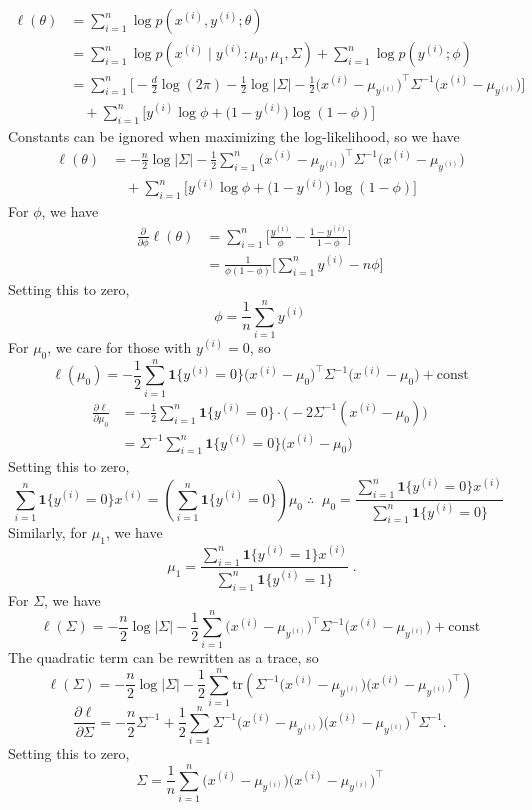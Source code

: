 \begin{answer}

$$
\begin{aligned}
\ell(\theta)
&=\sum_{i=1}^n \log p(x^{(i)},y^{(i)};\theta)\\
&=\sum_{i=1}^n \log p(x^{(i)}\mid y^{(i)};\mu_0,\mu_1,\Sigma)+\sum_{i=1}^n \log p(y^{(i)};\phi)\\
&=\sum_{i=1}^n\Bigg[-\frac{d}{2}\log(2\pi)-\frac{1}{2}\log|\Sigma|
-\frac{1}{2}\big(x^{(i)}-\mu_{y^{(i)}}\big)^\top\Sigma^{-1}\big(x^{(i)}-\mu_{y^{(i)}}\big)\Bigg]\\
&\quad +\sum_{i=1}^n\Big[y^{(i)}\log\phi+\big(1-y^{(i)}\big)\log(1-\phi)\Big]
\end{aligned}
$$
Constants can be ignored when maximizing the log-likelihood, so we have
$$
\begin{aligned}
\ell(\theta)
&=-\frac{n}{2}\log|\Sigma| - \frac{1}{2}\sum_{i=1}^n\big(x^{(i)}-\mu_{
y^{(i)}}\big)^\top\Sigma^{-1}\big(x^{(i)}-\mu_{y^{(i)}}\big)\\
&\quad +\sum_{i=1}^n\Big[y^{(i)}\log\phi+\big(1-y^{(i)}\big)\log(1-\phi)\Big]
\end{aligned}
$$
For $\phi$, we have
$$
\begin{aligned}
\frac{\partial}{\partial \phi}\ell(\theta)
&=\sum_{i=1}^n\Big[\frac{y^{(i)}}{\phi}-\frac{1-y^{(i)}}{1-\phi}\Big]\\
&=\frac{1}{\phi(1-\phi)}\Big[\sum_{i=1}^n y^{(i)} - n\phi\Big]
\end{aligned}
$$
Setting this to zero,
$$
\boxed{
\phi = \frac{1}{n}\sum_{i=1}^n y^{(i)}
}
$$
For $\mu_0$, we care for those with $y^{(i)}=0$, so
$$
\ell(\mu_0) = -\frac{1}{2}\sum_{i=1}^n \mathbf{1}\{y^{(i)}=0\}
\big(x^{(i)}-\mu_0\big)^\top\Sigma^{-1}\big(x^{(i)}-\mu_0\big) + \text{const}
$$
$$
\begin{aligned}
\frac{\partial \ell}{\partial \mu_0}
&= -\frac{1}{2}\sum_{i=1}^n \mathbf{1}\{y^{(i)}=0\}\cdot 
\big(-2\Sigma^{-1}(x^{(i)}-\mu_0)\big)\\
&=\Sigma^{-1}\sum_{i=1}^n \mathbf{1}\{y^{(i)}=0\}\big(x^{(i)}-\mu_0\big)
\end{aligned}
$$
Setting this to zero,
$$
\sum_{i=1}^n \mathbf{1}\{y^{(i)}=0\}x^{(i)}=
\left(\sum_{i=1}^n \mathbf{1}\{y^{(i)}=0\}\right)\mu_0
\;\therefore\;
\boxed{\;\displaystyle \mu_0=\frac{\sum_{i=1}^n \mathbf{1}\{y^{(i)}=0\}x^{(i)}}{\sum_{i=1}^n \mathbf{1}\{y^{(i)}=0\}}\; }
$$
Similarly, for $\mu_1$, we have
$$
\boxed{\;\displaystyle \mu_1=\frac{\sum_{i=1}^n \mathbf{1}\{y^{(i)}=1\}x^{(i)}}{\sum_{i=1}^n \mathbf{1}\{y^{(i)}=1\}}\; }.
$$
For $\Sigma$, we have
$$
\ell(\Sigma)=-\frac{n}{2}\log|\Sigma|-\frac{1}{2}\sum_{i=1}^n
\big(x^{(i)}-\mu_{y^{(i)}}\big)^\top\Sigma^{-1}\big(x^{(i)}-\mu_{y^{(i)}}\big)+\text{const}
$$
The quadratic term can be rewritten as a trace, so
$$
\ell(\Sigma)=-\frac{n}{2}\log|\Sigma|-\frac{1}{2}\sum_{i=1}^n
\text{tr}(\Sigma^{-1}\big(x^{(i)}-\mu_{y^{(i)}}\big)\big(x^{(i)}-\mu_{y^{(i)}}\big)^\top)
$$
$$
\frac{\partial \ell}{\partial \Sigma}
=-\frac{n}{2}\Sigma^{-1}+\frac{1}{2}\sum_{i=1}^n\Sigma^{-1}\big(x^{(i)}-\mu_{y^{(i)}}\big)\big(x^{(i)}-\mu_{y^{(i)}}\big)^\top\Sigma^{-1}.
$$
Setting this to zero,
$$
\boxed{
\Sigma = \frac{1}{n}\sum_{i=1}^n \big(x^{(i)}-\mu_{y^{(i)}}\big)\big(x^{(i)}-\mu_{y^{(i)}}\big)^\top
}
$$
\end{answer}
